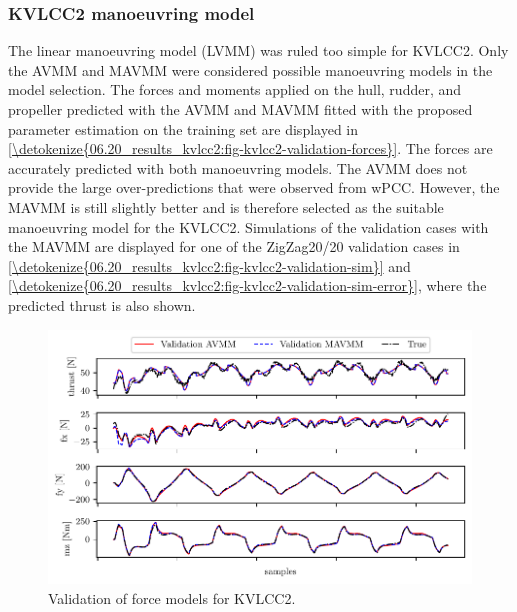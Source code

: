 \subsubsection{KVLCC2 manoeuvring model}
\label{\detokenize{06.20_results_kvlcc2:kvlcc2-manoeuvring-model}}
The linear manoeuvring model (LVMM) was ruled too simple for KVLCC2. Only the AVMM and MAVMM were considered possible manoeuvring models in the model selection.
The forces and moments applied on the hull, rudder, and propeller predicted with the AVMM and MAVMM fitted with the proposed parameter estimation on the training set are displayed in \hyperref[\detokenize{06.20_results_kvlcc2:fig-kvlcc2-validation-forces}]{\autoref{\detokenize{06.20_results_kvlcc2:fig-kvlcc2-validation-forces}}}.
The forces are accurately predicted with both manoeuvring models. The AVMM does not provide the large over-predictions that were observed from wPCC. However, the MAVMM is still slightly better and is therefore selected as the suitable manoeuvring model for the KVLCC2.
Simulations of the validation cases with the MAVMM are displayed for one of the ZigZag20/20 validation cases in \hyperref[\detokenize{06.20_results_kvlcc2:fig-kvlcc2-validation-sim}]{\autoref{\detokenize{06.20_results_kvlcc2:fig-kvlcc2-validation-sim}}} and \hyperref[\detokenize{06.20_results_kvlcc2:fig-kvlcc2-validation-sim-error}]{\autoref{\detokenize{06.20_results_kvlcc2:fig-kvlcc2-validation-sim-error}}}, where the predicted thrust is also shown.
\begin{figure}[h]
\centering
\includegraphics[width=1.0\textwidth]{kappa/images/14.pdf}
\caption{Validation of force models for KVLCC2.}\label{\detokenize{06.20_results_kvlcc2:fig-kvlcc2-validation-forces}}\end{figure}
